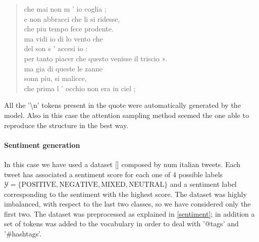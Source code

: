 \documentclass[10pt,twocolumn,letterpaper]{article}
\begin{document}
\begin{quote}
 che mai non m ’ io coglia ;\\
 e non abbracci che li si ridesse,\\
 che piu tempo fece prodente.\\


 ma vidi io di lo vento che\\
 del son s ’ accesi io :\\
 per tanto piacer che questo venisse il triscio ».\\


 ma gia di queste le zanne\\
 sonn piu, si malicce,\\
 che prima l ’ occhio non era in ciel ;\\

\end{quote}

%
%
%
%

All the '\textbackslash n' tokens present in the quote were automatically generated by the model.
Also in this case the attention sampling method seemed the one able to reproduce the structure in the best way.


\paragraph{Sentiment generation} In this case we have used a dataset [] composed by num italian tweets.
Each tweet has associated a sentiment score for each one of 4 possible labels
$\mathcal Y = \{\text{POSITIVE}, \text{NEGATIVE}, \text{MIXED}, \text{NEUTRAL}\}$ and a sentiment label corresponding
to the sentiment with the highest score.
The dataset was highly imbalanced, with respect to the last two classes, so we have considered only the first two.
The dataset was preprocessed as explained in \ref{sentiment}; in addition a set of tokens was added to the vocabulary
in order to deal with '@tags' and '#hashtags'.\\
\end{document}
